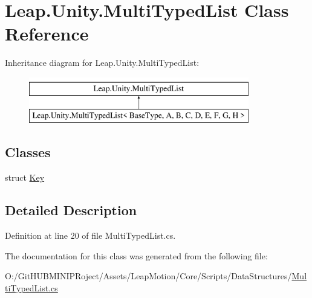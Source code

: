 \hypertarget{class_leap_1_1_unity_1_1_multi_typed_list}{}\section{Leap.\+Unity.\+Multi\+Typed\+List Class Reference}
\label{class_leap_1_1_unity_1_1_multi_typed_list}
Inheritance diagram for Leap.\+Unity.\+Multi\+Typed\+List\+:\begin{figure}[H]
\begin{center}
\leavevmode
\includegraphics[height=2.000000cm]{class_leap_1_1_unity_1_1_multi_typed_list}
\end{center}
\end{figure}
\subsection*{Classes}
\begin{DoxyCompactItemize}
\item 
struct \mbox{\hyperlink{struct_leap_1_1_unity_1_1_multi_typed_list_1_1_key}{Key}}
\end{DoxyCompactItemize}


\subsection{Detailed Description}


Definition at line 20 of file Multi\+Typed\+List.\+cs.



The documentation for this class was generated from the following file\+:\begin{DoxyCompactItemize}
\item 
O\+:/\+Git\+H\+U\+B\+M\+I\+N\+I\+P\+Roject/\+Assets/\+Leap\+Motion/\+Core/\+Scripts/\+Data\+Structures/\mbox{\hyperlink{_multi_typed_list_8cs}{Multi\+Typed\+List.\+cs}}\end{DoxyCompactItemize}
